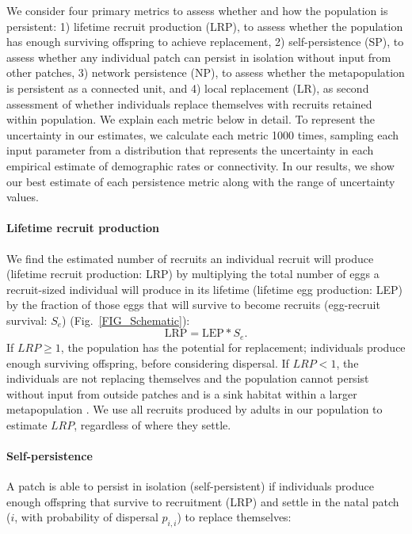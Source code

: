 \documentclass[12pt, oneside]{article}   	%
\begin{document}
We consider four primary metrics to assess whether and how the population is persistent: 1) lifetime recruit production (LRP), to assess whether the population has enough surviving offspring to achieve replacement, 2) self-persistence (SP), to assess whether any individual patch can persist in isolation without input from other patches, 3) network persistence (NP), to assess whether the metapopulation is persistent as a connected unit, and 4) local replacement (LR), as second assessment of whether individuals replace themselves with recruits retained within population. We explain each metric below in detail. To represent the uncertainty in our estimates, we calculate each metric 1000 times, sampling each input parameter from a distribution that represents the uncertainty in each empirical estimate of demographic rates or connectivity. In our results, we show our best estimate of each persistence metric along with the range of uncertainty values. %

\paragraph*{Lifetime recruit production}

We find the estimated number of recruits an individual recruit will produce (lifetime recruit production: LRP) by multiplying the total number of eggs a recruit-sized individual will produce in its lifetime (lifetime egg production: LEP) by the fraction of those eggs that will survive to become recruits (egg-recruit survival: $S_e$) (Fig.\ \ref{FIG_Schematic}):
\begin{equation}
\text{LRP} = \text{LEP} * S_e. \label{EQN_LRP}
\end{equation}
If $LRP \geq 1$, the population has the potential for replacement; individuals produce enough surviving offspring, before considering dispersal. If $LRP < 1$, the individuals are not replacing themselves and the population cannot persist without input from outside patches and is a sink habitat within a larger metapopulation \citep{pulliam1988sources}. We use all recruits produced by adults in our population to estimate $LRP$, regardless of where they settle.

\paragraph*{Self-persistence} 

A patch is able to persist in isolation (self-persistent) if individuals produce enough offspring that survive to recruitment (LRP) and settle in the natal patch ($i$, with probability of dispersal $p_{i,i}$) to replace themselves:
\end{document}
